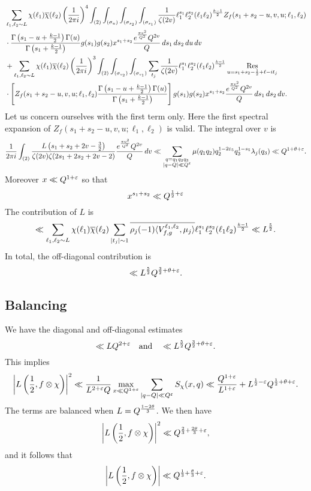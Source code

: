 \documentclass[12pt,reqno,oneside]{amsart}
\begin{document}
    \begin{align*}
      &\sum_{\ell_{1},\ell_{2} \sim L}\chi(\ell_{1})\overline{\chi}(\ell_{2})\left(\frac{1}{2\pi i}\right)^{4}\int_{(2)}\int_{(\sigma_{u})}\int_{(\sigma_{s_{2}})}\int_{(\sigma_{s_{1}})}\frac{1}{\zeta(2v)}\ell_{1}^{s_{1}}\ell_{2}^{s_{2}}(\ell_{1}\ell_{2})^{\frac{k-1}{2}}Z_{f}(s_{1}+s_{2}-u,v,u;\ell_{1},\ell_{2}) \\
      &\cdot \frac{\Gamma\left(s_{1}-u+\frac{k-1}{2}\right)\Gamma(u)}{\Gamma\left(s_{1}+\frac{k-1}{2}\right)}g(s_{1})g(s_{2})x^{s_{1}+s_{2}}\frac{e^{\frac{\pi v^{2}}{Q^{2}}}Q^{2v}}{Q}\,ds_{1}\,ds_{2}\,du\,dv \\
      &+ \sum_{\ell_{1},\ell_{2} \sim L}\chi(\ell_{1})\overline{\chi}(\ell_{2})\left(\frac{1}{2\pi i}\right)^{3}\int_{(2)}\int_{(\sigma_{s_{2}})}\int_{(\sigma_{s_{1}})}\sum_{t_{j}}\frac{1}{\zeta(2v)}\ell_{1}^{s_{1}}\ell_{2}^{s_{2}}(\ell_{1}\ell_{2})^{\frac{k-1}{2}}\operatorname*{\mathrm{Res}}_{u = s_{1}+s_{2}-\frac{1}{2}+\ell-it_{j}} \\
      &\cdot \left[Z_{f}(s_{1}+s_{2}-u,v,u;\ell_{1},\ell_{2})\frac{\Gamma\left(s_{1}-u+\frac{k-1}{2}\right)\Gamma(u)}{\Gamma\left(s_{1}+\frac{k-1}{2}\right)}\right]g(s_{1})g(s_{2})x^{s_{1}+s_{2}}\frac{e^{\frac{\pi v^{2}}{Q^{2}}}Q^{2v}}{Q}\,ds_{1}\,ds_{2}\,dv.
    \end{align*}
    Let us concern ourselves with the first term only. Here the first spectral expansion of $Z_{f}(s_{1}+s_{2}-u,v,u;\ell_{1},\ell_{2})$ is valid. The integral over $v$ is
    \[
      \frac{1}{2\pi i}\int_{(2)}\frac{L\left(s_{1}+s_{2}+2v-\frac{3}{2}\right)}{\zeta(2v)\zeta(2s_{1}+2s_{2}+2v-2)}\frac{e^{\frac{\pi v^{2}}{Q^{2}}}Q^{2v}}{Q}\,dv \ll \sum_{\substack{q = q_{1}q_{2}q_{3} \\ |q-Q| \ll Q^{\varepsilon}}}\mu(q_{1}q_{2})q_{2}^{1-2\varepsilon_{5}}q_{3}^{1-s_{5}}\lambda_{j}(q_{3}) \ll Q^{1+\theta+\varepsilon}.
    \]
    Moreover $x \ll Q^{1+\varepsilon}$ so that
    \[
      x^{s_{1}+s_{2}} \ll Q^{\frac{1}{2}+\varepsilon}
    \]
    The contribution of $L$ is
    \[
      \ll \sum_{\ell_{1},\ell_{2} \sim L}\chi(\ell_{1})\overline{\chi}(\ell_{2})\sum_{|t_{j}| \sim 1}\overline{\rho_{j}(-1)\langle V_{f,g}^{\ell_{1},\ell_{2}},\mu_{j}\rangle}\ell_{1}^{s_{1}}\ell_{2}^{s_{2}}(\ell_{1}\ell_{2})^{\frac{k-1}{2}} \ll L^{\frac{5}{2}}.
    \]
    In total, the off-diagonal contribution is
    \[
      \ll L^{\frac{5}{2}}Q^{\frac{3}{2}+\theta+\varepsilon}.
    \]
  \subsection*{Balancing}
    We have the diagonal and off-diagonal estimates
    \[
      \ll LQ^{2+\varepsilon} \quad \text{and} \quad \ll L^{\frac{5}{2}}Q^{\frac{3}{2}+\theta+\varepsilon}.
    \]
    This implies
    \[
      \left|L\left(\frac{1}{2},f \otimes \chi \right)\right|^{2} \ll \frac{1}{L^{2+\varepsilon}Q}\max_{x \ll Q^{1+\varepsilon}}\sum_{|q-Q| \ll Q^{\varepsilon}}S_{\chi}(x,q) \ll \frac{Q^{1+\varepsilon}}{L^{1+\varepsilon}}+L^{\frac{1}{2}-\varepsilon}Q^{\frac{1}{2}+\theta+\varepsilon}.
    \]
    The terms are balanced when $L = Q^{\frac{1-2\theta}{3}}$. We then have
    \[
      \left|L\left(\frac{1}{2},f \otimes \chi \right)\right|^{2} \ll Q^{\frac{2}{3}+\frac{2\theta}{3}+\varepsilon},
    \]
    and it follows that
    \[
      \left|L\left(\frac{1}{2},f \otimes \chi \right)\right| \ll Q^{\frac{1}{3}+\frac{\theta}{3}+\varepsilon}.
    \]
\end{document}
